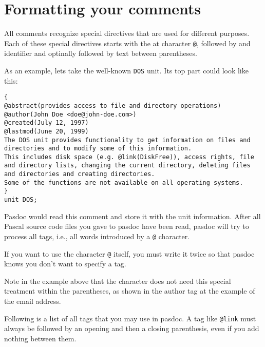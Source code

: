 \documentclass[11pt]{article}
\begin{document}
\section{Formatting your comments}

All comments recognize special directives that are used for different
purposes. Each of these special directives starts with the at character 
{\tt @}, followed by and identifier and optinally followed by text 
between parentheses. 

As an example, lets take the well-known {\tt DOS} unit.
Its top part could look like this:
\begin{verbatim}
{
@abstract(provides access to file and directory operations)
@author(John Doe <doe@john-doe.com>)
@created(July 12, 1997)
@lastmod(June 20, 1999)
The DOS unit provides functionality to get information on files and
directories and to modify some of this information.
This includes disk space (e.g. @link(DiskFree)), access rights, file
and directory lists, changing the current directory, deleting files
and directories and creating directories.
Some of the functions are not available on all operating systems.
}
unit DOS;
\end{verbatim}

Pasdoc would read this comment and store it with the unit information.
After all Pascal source code files you gave to pasdoc have been read,
pasdoc will try to process all tags, i.e., all words introduced by a
{\tt @} character.

If you want to use the character {\tt @} itself, you must write it twice
so that pasdoc knows you don't want to specify a tag.

Note in the example above that the character does not need this
special treatment within the parentheses, as shown in the author tag
at the example of the email address.

Following is a list of all tags that you may use in pasdoc.
A tag like {\tt @link} must always be followed by an opening
and then a closing parenthesis, even if you add nothing between them.
\end{document}
